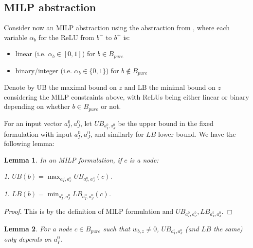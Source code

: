 \documentclass[]{article}
\newtheorem{lemma}{Lemma}
\theoremstyle{definition}
\begin{document}
\subsection{MILP abstraction}

Consider now an MILP abstraction using the abstraction from \cite{MILP}, 
where each variable $\alpha_b$ for the ReLU from $b^-$ to $b^+$ is:
\begin{itemize}
	\item linear  (i.e. $\alpha_b \in [0,1]$) for $b \in B_{pure}$
	\item binary/integer (i.e. $\alpha_b \in \{0,1\}$) for $b \notin B_{pure}$
\end{itemize}

Denote by $\mathrm{UB}$ the maximal bound on $z$ and $\mathrm{LB}$ the minimal bound on $z$ considering the MILP constraints above, with ReLUs being either linear or binary depending on whether $b \in B_{pure}$ or not.

For an input vector $a^0_I,a^0_J$, let $UB_{a^0_I,a^0_J}$ be the upper bound in the fixed formulation with input $a^0_I,a^0_J$, and similarly for $LB$ lower bound. We have the following lemma:

\begin{lemma} In an MILP formulation, if $c$ is a node:
	
	1. $UB(b)=\max_{a^0_I,a^0_J}UB_{a^0_I,a^0_J}(c)$. 
	
		1. $LB(b)=\min_{a^0_I,a^0_J}LB_{a^0_I,a^0_J}(c)$. 
\end{lemma}

\begin{proof}
	This is by the definition of MILP formulation and $UB_{a^0_I,a^0_J}, LB_{a^0_I,a^0_J}$.
\end{proof}

\begin{lemma}\label{lem:pure_node}
	For a node $c\in B_{pure}$ such that $w_{b,z}\neq 0$, $UB_{a^0_I,a^0_J}$ (and $LB$ the same) only depends on $a^0_I$.
\end{lemma}
\end{document}
